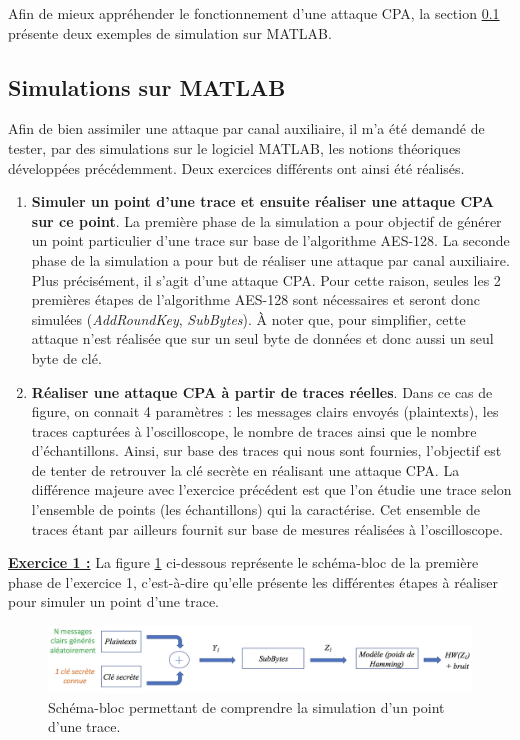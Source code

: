 \documentclass[oneside]{book}
\begin{document}
\newpage



Afin de mieux appréhender le fonctionnement d'une attaque CPA, la section \ref{sec:simulCPA} présente deux exemples de simulation sur MATLAB.








\newpage

\subsection{Simulations sur MATLAB}
\label{sec:simulCPA}

Afin de bien assimiler une attaque par canal auxiliaire, il m'a été demandé de tester, par des simulations sur le logiciel MATLAB, les notions théoriques développées précédemment. Deux exercices différents ont ainsi été réalisés. 
\begin{enumerate}
\item \textbf{Simuler un point d'une trace et ensuite réaliser une attaque CPA sur ce point}. La première phase de la simulation a pour objectif de générer un point particulier d'une trace sur base de l'algorithme AES-128. La seconde phase de la simulation a pour but de réaliser une attaque par canal auxiliaire. Plus précisément, il s'agit d'une attaque CPA. Pour cette raison, seules les 2 premières étapes de l'algorithme AES-128 sont nécessaires et seront donc simulées (\textit{AddRoundKey}, \textit{SubBytes}). À noter que, pour simplifier, cette attaque n'est réalisée que sur un seul byte de données et donc aussi un seul byte de clé.
\item \textbf{Réaliser une attaque CPA à partir de traces réelles}. Dans ce cas de figure, on connait 4 paramètres : les messages clairs envoyés (plaintexts), les traces capturées à l'oscilloscope, le nombre de traces ainsi que le nombre d'échantillons. Ainsi, sur base des traces qui nous sont fournies, l'objectif est de tenter de retrouver la clé secrète en réalisant une attaque CPA. La différence majeure avec l'exercice précédent est que l'on étudie une trace selon l'ensemble de points (les échantillons) qui la caractérise. Cet ensemble de traces étant par ailleurs fournit sur base de mesures réalisées à l'oscilloscope. \\
\end{enumerate}

\hspace{-0.5 cm}\textbf{\underline{Exercice 1 :}} La figure \ref{fig:simul1} ci-dessous représente le schéma-bloc de la première phase de l'exercice 1, c'est-à-dire qu'elle présente les différentes étapes à réaliser pour simuler un point d'une trace.
\begin{figure}[htbp]
    \centering
    \includegraphics[scale=0.45]{image/simul1}
    \caption{Schéma-bloc permettant de comprendre la simulation d'un point d'une trace.}
    \label{fig:simul1} 
\end{figure}
\end{document}
